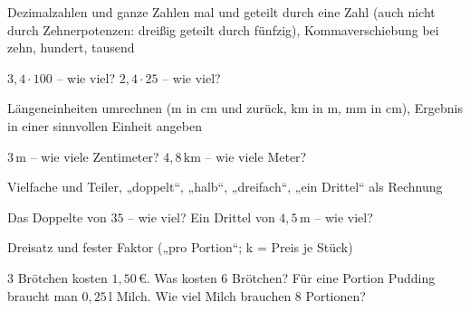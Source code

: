 \setcounter{aufgabe}{0}

\begin{aufgabe}{Dezimalzahlen und ganze Zahlen mal und geteilt durch eine Zahl (auch nicht durch Zehnerpotenzen: dreißig geteilt durch fünfzig), Kommaverschiebung bei zehn, hundert, tausend}
\begin{teile}
\teil $3{,}4 \cdot 100$ – wie viel? \leerfeld
\teil $2{,}4 \cdot 25$ – wie viel? \leerfeld
\end{teile}
\end{aufgabe}

\begin{aufgabe}{Längeneinheiten umrechnen (m in cm und zurück, km in m, mm in cm), Ergebnis in einer sinnvollen Einheit angeben}
\begin{teile}
\teil $3\,\text{m}$ – wie viele Zentimeter? \leerfeld[cm]
\teil $4{,}8\,\text{km}$ – wie viele Meter? \leerfeld[m]
\end{teile}
\end{aufgabe}

\begin{aufgabe}{Vielfache und Teiler, „doppelt“, „halb“, „dreifach“, „ein Drittel“ als Rechnung}
\begin{teile}
\teil Das Doppelte von $35$ – wie viel? \leerfeld
\teil Ein Drittel von $4{,}5\,\text{m}$ – wie viel? \leerfeld[m]
\end{teile}
\end{aufgabe}

\begin{aufgabe}{Dreisatz und fester Faktor („pro Portion“; k = Preis je Stück)}
\begin{teile}
\teil $3$ Brötchen kosten $1{,}50\,€$. Was kosten $6$ Brötchen? \leerfeld[€]
\teil Für eine Portion Pudding braucht man $0{,}25\,\text{l}$ Milch. Wie viel Milch brauchen $8$ Portionen? \leerfeld[l]
\end{teile}
\end{aufgabe}

